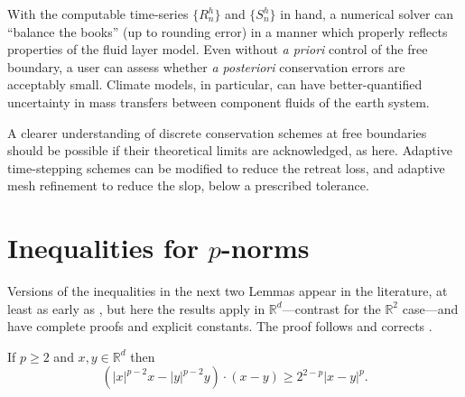 \documentclass[final,onefignum]{siamart190516}
\newcommand\RR{\mathbb{R}}
\begin{document}
With the computable time-series $\{R_n^h\}$ and $\{S_n^h\}$ in hand, a numerical solver can ``balance the books'' (up to rounding error) in a manner which properly reflects properties of the fluid layer model.  Even without \emph{a priori} control of the free boundary, a user can assess whether \emph{a posteriori} conservation errors are acceptably small.  Climate models, in particular, can have better-quantified uncertainty in mass transfers between component fluids of the earth system.

A clearer understanding of discrete conservation schemes at free boundaries should be possible if their theoretical limits are acknowledged, as here.  Adaptive time-stepping schemes can be modified to reduce the retreat loss, and adaptive mesh refinement to reduce the slop, below a prescribed tolerance.






\appendix

\section{Inequalities for $p$-norms}   \label{app:pinequalities}  Versions of the inequalities in the next two Lemmas appear in the literature, at least as early as \cite{GlowinskiMarroco1975}, but here the results apply in $\RR^d$---contrast \cite{BarrettLiu1993,GlowinskiMarroco1975} for the $\RR^2$ case---and have complete proofs and explicit constants.  The proof follows and corrects \cite[Appendix A]{Peral1997}.

\begin{lemma}  \label{lem:pbiginequality}  If $p\ge 2$ and $x,y\in\RR^d$ then
\begin{equation}
\left(|x|^{p-2} x - |y|^{p-2} y\right)\cdot(x-y) \ge 2^{2-p} |x-y|^p. \label{eq:pbiginequality}
\end{equation}
\end{lemma}
\end{document}
